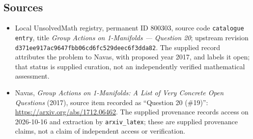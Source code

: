 \documentclass[11pt]{article}
\begin{document}
\subsection{Sources}
\begin{itemize}
\item Local UnsolvedMath registry, permanent ID \(800303\), source code \texttt{catalogue entry}, title \emph{Group Actions on 1-Manifolds --- Question 20}; upstream revision \texttt{d371ee917ac9647fbb06cd6fc529deec6f3dda82}. The supplied record attributes the problem to Navas, with proposed year 2017, and labels it open; that status is supplied curation, not an independently verified mathematical assessment.
\item Navas, \emph{Group Actions on 1-Manifolds: A List of Very Concrete Open Questions} (2017), source item recorded as ``Question 20 (\#19)'': \url{https://arxiv.org/abs/1712.06462}. The supplied provenance records access on 2026-10-16 and extraction by \texttt{arxiv\_latex}; these are supplied provenance claims, not a claim of independent access or verification.
\end{itemize}
\end{document}
